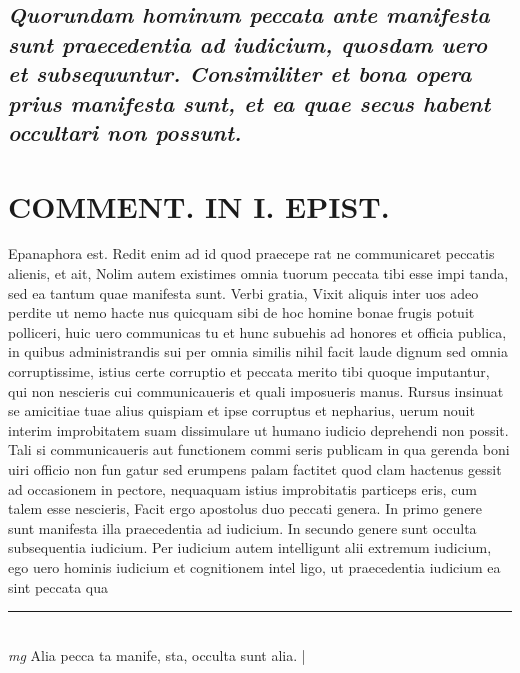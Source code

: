 \documentclass{article}
\begin{document}
\begin{pages}
\subsection*{\textit{Quorundam hominum peccata ante manifesta sunt praecedentia ad iudicium, quosdam uero et subsequuntur. Consimiliter et bona opera prius manifesta sunt, et ea quae secus habent occultari non possunt. }}
\section*{COMMENT. IN I. EPIST. }\pstart Epanaphora est. Redit enim ad id quod praecepe rat ne communicaret peccatis alienis, et ait, Nolim autem existimes omnia tuorum peccata tibi esse impi tanda, sed ea tantum quae manifesta sunt. Verbi gratia, Vixit aliquis inter uos adeo perdite ut nemo hacte nus quicquam sibi de hoc homine bonae frugis potuit polliceri, huic uero communicas tu et hunc subuehis ad honores et officia publica, in quibus administrandis sui per omnia similis nihil facit laude dignum sed omnia corruptissime, istius certe corruptio et peccata merito tibi quoque imputantur, qui non nescieris cui communicaueris et quali imposueris manus. Rursus insinuat se amicitiae tuae alius quispiam et ipse corruptus et nepharius, uerum nouit interim improbitatem suam dissimulare ut humano iudicio deprehendi non possit. Tali si communicaueris aut functionem commi seris publicam in qua gerenda boni uiri officio non fun gatur sed erumpens palam factitet quod clam hactenus gessit ad occasionem in pectore, nequaquam istius improbitatis particeps eris, cum talem esse nescieris, Facit ergo apostolus duo peccati genera. In primo genere sunt manifesta illa praecedentia ad iudicium. In secundo genere sunt occulta subsequentia iudicium. Per iudicium autem intelligunt alii extremum iudicium, ego uero hominis iudicium et cognitionem intel ligo, ut praecedentia iudicium ea sint peccata qua  \pend
\vspace{0.5cm}\noindent
\vspace{0.2cm}\rule{1cm}{0.2pt}\\ 
\hspace{0.2cm}\textit{mg}
\footnotesize Alia pecca ta manife, sta, occulta sunt alia. 
\normalsize| 

\end{pages}
\end{document}
